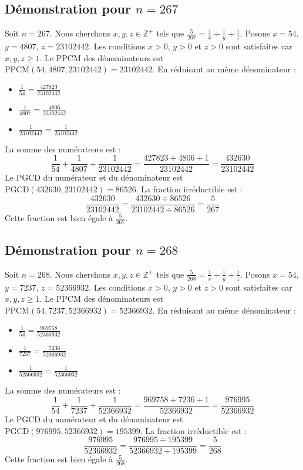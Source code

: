 \documentclass[11pt,a4paper]{article}
\begin{document}
\subsection{Démonstration pour $n = 267$}
Soit $n = 267$. Nous cherchons $x, y, z \in \mathbb{Z}^{+}$ tels que $\frac{5}{267} = \frac{1}{x} + \frac{1}{y} + \frac{1}{z}$.
Posons $x = 54$, $y = 4807$, $z = 23102442$.
Les conditions $x > 0$, $y > 0$ et $z > 0$ sont satisfaites car $x, y, z \geq 1$.
Le PPCM des dénominateurs est $\text{PPCM}(54, 4807, 23102442) = 23102442$.
En réduisant au même dénominateur :
\begin{itemize}
    \item $\frac{1}{54} = \frac{427823}{23102442}$
    \item $\frac{1}{4807} = \frac{4806}{23102442}$
    \item $\frac{1}{23102442} = \frac{1}{23102442}$
\end{itemize}
La somme des numérateurs est :
$$ \frac{1}{54} + \frac{1}{4807} + \frac{1}{23102442} = \frac{427823 + 4806 + 1}{23102442} = \frac{432630}{23102442} $$
Le PGCD du numérateur et du dénominateur est $\text{PGCD}(432630, 23102442) = 86526$.
La fraction irréductible est :
$$ \frac{432630}{23102442} = \frac{432630 \div 86526}{23102442 \div 86526} = \frac{5}{267} $$
Cette fraction est bien égale à $\frac{5}{267}$.

\subsection{Démonstration pour $n = 268$}
Soit $n = 268$. Nous cherchons $x, y, z \in \mathbb{Z}^{+}$ tels que $\frac{5}{268} = \frac{1}{x} + \frac{1}{y} + \frac{1}{z}$.
Posons $x = 54$, $y = 7237$, $z = 52366932$.
Les conditions $x > 0$, $y > 0$ et $z > 0$ sont satisfaites car $x, y, z \geq 1$.
Le PPCM des dénominateurs est $\text{PPCM}(54, 7237, 52366932) = 52366932$.
En réduisant au même dénominateur :
\begin{itemize}
    \item $\frac{1}{54} = \frac{969758}{52366932}$
    \item $\frac{1}{7237} = \frac{7236}{52366932}$
    \item $\frac{1}{52366932} = \frac{1}{52366932}$
\end{itemize}
La somme des numérateurs est :
$$ \frac{1}{54} + \frac{1}{7237} + \frac{1}{52366932} = \frac{969758 + 7236 + 1}{52366932} = \frac{976995}{52366932} $$
Le PGCD du numérateur et du dénominateur est $\text{PGCD}(976995, 52366932) = 195399$.
La fraction irréductible est :
$$ \frac{976995}{52366932} = \frac{976995 \div 195399}{52366932 \div 195399} = \frac{5}{268} $$
Cette fraction est bien égale à $\frac{5}{268}$.
\end{document}
